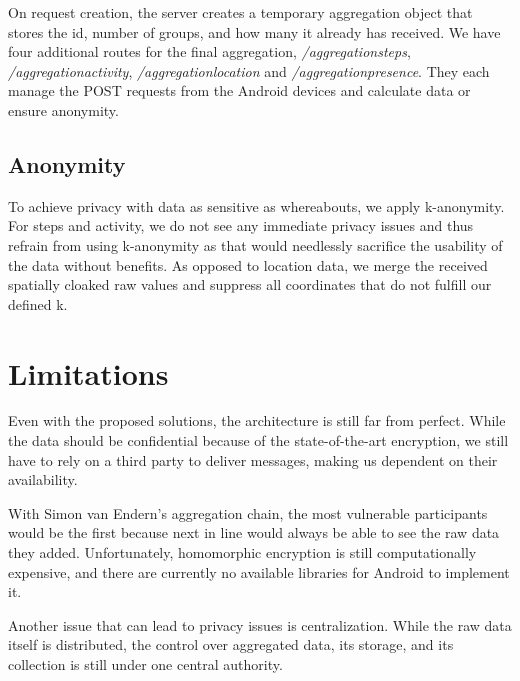 On request creation, the server creates a temporary aggregation object that stores the id, number of groups, and how many it already has received. We have four additional routes for the final aggregation, \textit{/aggregationsteps}, \textit{/aggregationactivity}, \textit{/aggregationlocation} and \textit{/aggregationpresence}. They each manage the POST requests from the Android devices and calculate data or ensure anonymity.

\subsection{Anonymity}

To achieve privacy with data as sensitive as whereabouts, we apply k-anonymity. For steps and activity, we do not see any immediate privacy issues and thus refrain from using k-anonymity as that would needlessly sacrifice the usability of the data without benefits. As opposed to location data, we merge the received spatially cloaked raw values and suppress all coordinates that do not fulfill our defined k. 

\section{Limitations}
Even with the proposed solutions, the architecture is still far from perfect. While the data should be confidential because of the state-of-the-art encryption, we still have to rely on a third party to deliver messages, making us dependent on their availability.

With Simon van Endern's aggregation chain, the most vulnerable participants would be the first because next in line would always be able to see the raw data they added. Unfortunately, homomorphic encryption is still computationally expensive, and there are currently no available libraries for Android to implement it.

Another issue that can lead to privacy issues is centralization. While the raw data itself is distributed, the control over aggregated data, its storage, and its collection is still under one central authority.